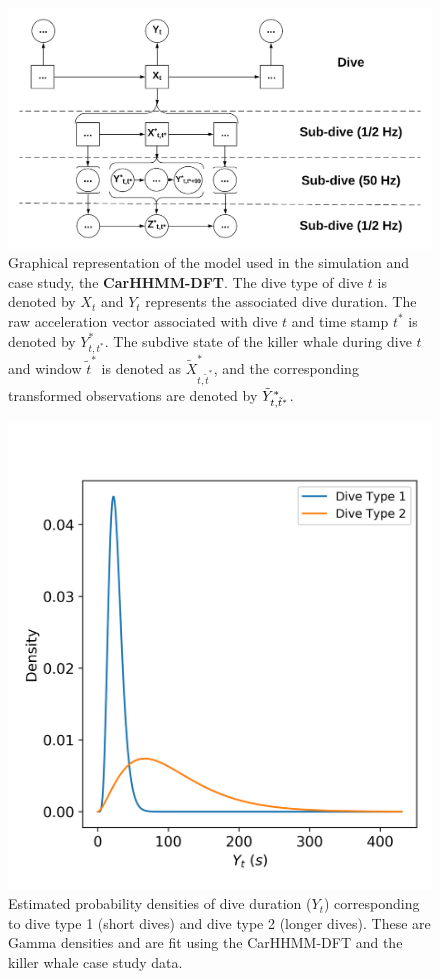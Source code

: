 
\begin{figure}[ht]
	\centering
	\includegraphics[width=5in]{../Plots/CarHHMM-DFT.png}
	\caption{Graphical representation of the model used in the simulation and case study, the \textbf{CarHHMM-DFT}. The dive type of dive $t$ is denoted by $X_t$ and $Y_t$ represents the associated dive duration. The raw acceleration vector associated with dive $t$ and time stamp $t^*$ is denoted by $Y^*_{t,t^*}$. The subdive state of the killer whale during dive $t$ and window $\tilde t^*$ is denoted as $\tilde X^*_{t,\tilde t^*}$, and the corresponding transformed observations are denoted by $\tilde{Y}^*_{t,\tilde t^*}$.}
	\label{fig:CarHHMM-DFT}
\end{figure}

\begin{figure}[ht]
	\centering
	\includegraphics[width=5in]{../Plots/CarHHMM2-coarse-emissions.png}
	\caption{Estimated probability densities of dive duration ($Y_t$) corresponding to dive type 1 (short dives) and dive type 2 (longer dives). These are Gamma densities and are fit using the CarHHMM-DFT and the killer whale case study data.}
	\label{fig:coarse_emis}
\end{figure}

